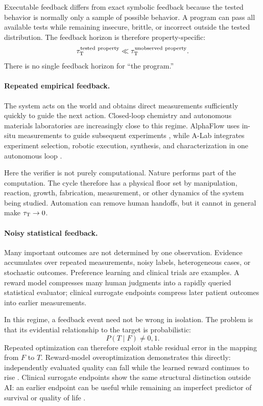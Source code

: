 Executable feedback differs from exact symbolic feedback because the tested behavior
is normally only a sample of possible behavior.  A program can pass all available
tests while remaining insecure, brittle, or incorrect outside the tested distribution.
The feedback horizon is therefore property-specific:
\[
    \tau_{\mathrm{T}}^{\mathrm{tested\ property}}
    \ll
    \tau_{\mathrm{T}}^{\mathrm{unobserved\ property}}.
\]
There is no single feedback horizon for ``the program.''

\paragraph{Repeated empirical feedback.}
The system acts on the world and obtains direct measurements sufficiently quickly to
guide the next action.  Closed-loop chemistry and autonomous materials laboratories
are increasingly close to this regime.  AlphaFlow uses in-situ measurements to guide
subsequent experiments \parencite{volk2023alphaflow}, while A-Lab integrates experiment
selection, robotic execution, synthesis, and characterization in one autonomous loop
\parencite{szymanski2023alab}.

Here the verifier is not purely computational.  Nature performs part of the
computation.  The cycle therefore has a physical floor set by manipulation, reaction,
growth, fabrication, measurement, or other dynamics of the system being studied.
Automation can remove human handoffs, but it cannot in general make
\(\tau_{\mathrm{T}}\rightarrow0\).

\paragraph{Noisy statistical feedback.}
Many important outcomes are not determined by one observation.  Evidence accumulates
over repeated measurements, noisy labels, heterogeneous cases, or stochastic outcomes.
Preference learning and clinical trials are examples.  A reward model compresses many
human judgments into a rapidly queried statistical evaluator; clinical surrogate
endpoints compress later patient outcomes into earlier measurements.

In this regime, a feedback event need not be wrong in isolation.  The problem is that
its evidential relationship to the target is probabilistic:
\[
    P(T\mid F) \neq 0,1.
\]
Repeated optimization can therefore exploit stable residual error in the mapping from
\(F\) to \(T\).  Reward-model overoptimization demonstrates this directly:
independently evaluated quality can fall while the learned reward continues to rise
\parencite{gao2022overoptimization,rafailov2024direct}.  Clinical surrogate endpoints show
the same structural distinction outside AI: an earlier endpoint can be useful while
remaining an imperfect predictor of survival or quality of life
\parencite{gyawali2019accelerated,naci2017accelerated,liu2024clinicalbenefit}.

